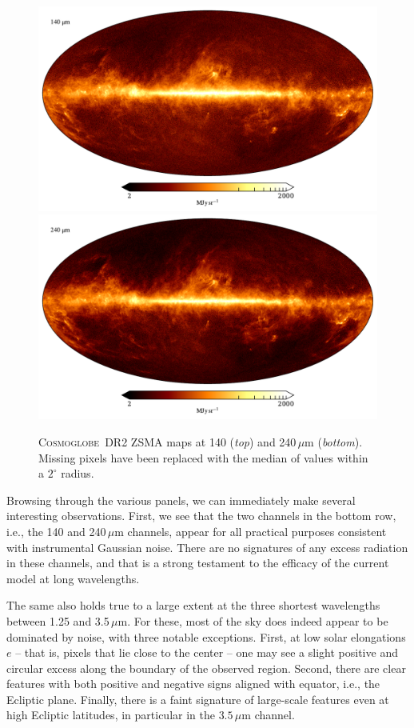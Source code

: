 \documentclass{aa}
\newcommand{\cosmoglobe}{\textsc{Cosmoglobe}}
\begin{document}
\begin{figure}
	\centering
	\includegraphics[width=0.96\linewidth]{figs/map_09.pdf}\\
	\includegraphics[width=0.96\linewidth]{figs/map_10.pdf}
	\caption{\cosmoglobe\ DR2 ZSMA maps at 140 (\emph{top}) and
          240$\,\mu$m (\emph{bottom}). Missing pixels have been replaced with
          the median of values within a $2^\circ$ radius.}
	\label{fig:freqmaps9_10}
\end{figure}

Browsing through the various panels, we can immediately make several
interesting observations. First, we see that the two channels in the
bottom row, i.e., the 140 and 240$\,\mu$m channels, appear for all
practical purposes consistent with instrumental Gaussian noise. There
are no signatures of any excess radiation in these channels, and that
is a strong testament to the efficacy of the current model at long
wavelengths.

The same also holds true to a large extent at the three shortest
wavelengths between 1.25 and 3.5$\,\mu$m. For these, most of the sky
does indeed appear to be dominated by noise, with three notable
exceptions. First, at low solar elongations $e$ -- that is, pixels
that lie close to the center -- one may see a slight positive and
circular excess along the boundary of the observed region. Second,
there are clear features with both positive and negative signs aligned
with equator, i.e., the Ecliptic plane. Finally, there is a faint
signature of large-scale features even at high Ecliptic latitudes, in
particular in the $3.5\,\mu$m channel.
\end{document}
